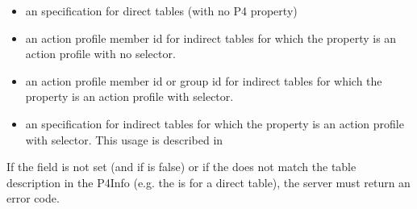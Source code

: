 \documentclass[11pt]{article}
\begin{document}
{\begin{itemize}
\item{}
an  specification for direct tables (with no P4 
property)%

\item{}
an action profile member id for indirect tables for which the 
property is an action profile with no selector.%

\item{}
an action profile member id or group id for indirect tables for which the
 property is an action profile with selector.%

\item{}
an  specification for indirect tables for
which the  property is an action profile with
selector. This usage is described in~%
\end{itemize}%

\noindent{}If the  field is not set (and if  is false) or if the
 does not match the table description in the P4Info (e.g. the  is
 for a direct table), the server must return an
 error code.%

}
\end{document}
